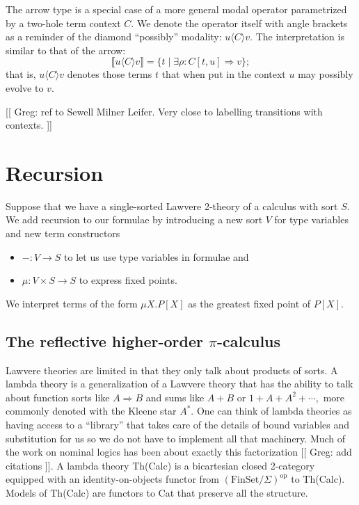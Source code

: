 \documentclass{llncs}
\newcommand{\interp}[1]{\llbracket #1 \rrbracket}
\newcommand{\maps}{\colon}
\newcommand{\FinSet}{\mathrm{FinSet}}
\newcommand{\op}{\mathrm{op}}
\begin{document}
The arrow type is a special case of a more general modal operator parametrized by a two-hole term context $C.$  We denote the operator itself with angle brackets as a reminder of the diamond ``possibly'' modality: $u \langle C \rangle v.$  The interpretation is similar to that of the arrow:
\[ \interp{u \langle C\rangle v} = \{ t \;|\; \exists \rho\maps C[t, u] \Rightarrow v \}; \]
that is, $u \langle C\rangle v$ denotes those terms $t$ that when put in the context $u$ may possibly evolve to $v.$

[[ Greg: ref to Sewell Milner Leifer.  Very close to labelling transitions with contexts. ]]

\section{Recursion}

Suppose that we have a single-sorted Lawvere 2-theory of a calculus with sort $S$.  We add recursion to our formulae by introducing a new sort $V$ for type variables and new term constructors 
\begin{itemize}
  \item $- \maps V \to S$ to let us use type variables in formulae and
  \item $\mu\maps V\times S \to S$ to express fixed points.
\end{itemize}

We interpret terms of the form $\mu X.P[X]$ as the greatest fixed point of $P[X].$

\subsection{The reflective higher-order $\pi$-calculus}

Lawvere theories are limited in that they only talk about products of sorts.  A lambda theory is a generalization of a Lawvere theory that has the ability to talk about function sorts like $A \Rightarrow B$ and sums like $A+B$ or $1 + A + A^2 + \cdots,$ more commonly denoted with the Kleene star $A^*.$  One can think of lambda theories as having access to a ``library'' that takes care of the details of bound variables and substitution for us so we do not have to implement all that machinery.  Much of the work on nominal logics has been about exactly this factorization [[ Greg: add citations ]].  A lambda theory Th(Calc) is a bicartesian closed 2-category equipped with an identity-on-objects functor from $(\FinSet/\Sigma)^{\op}$ to Th(Calc).  Models of Th(Calc) are functors to Cat that preserve all the structure.
\end{document}
